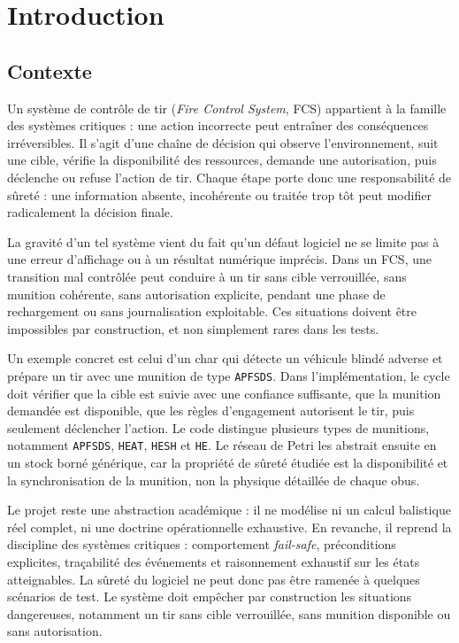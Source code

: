 \documentclass[11pt,a4paper]{report}
\begin{document}
\tableofcontents
\listoffigures
\listoftables
\clearpage
{}

\chapter{Introduction}

\section{Contexte}
Un système de contrôle de tir (\emph{Fire Control System}, FCS) appartient à la famille des systèmes critiques : une action incorrecte peut entraîner des conséquences irréversibles. Il s'agit d'une chaîne de décision qui observe l'environnement, suit une cible, vérifie la disponibilité des ressources, demande une autorisation, puis déclenche ou refuse l'action de tir. Chaque étape porte donc une responsabilité de sûreté : une information absente, incohérente ou traitée trop tôt peut modifier radicalement la décision finale.

La gravité d'un tel système vient du fait qu'un défaut logiciel ne se limite pas à une erreur d'affichage ou à un résultat numérique imprécis. Dans un FCS, une transition mal contrôlée peut conduire à un tir sans cible verrouillée, sans munition cohérente, sans autorisation explicite, pendant une phase de rechargement ou sans journalisation exploitable. Ces situations doivent être impossibles par construction, et non simplement rares dans les tests.

Un exemple concret est celui d'un char qui détecte un véhicule blindé adverse et prépare un tir avec une munition de type \texttt{APFSDS}. Dans l'implémentation, le cycle doit vérifier que la cible est suivie avec une confiance suffisante, que la munition demandée est disponible, que les règles d'engagement autorisent le tir, puis seulement déclencher l'action. Le code distingue plusieurs types de munitions, notamment \texttt{APFSDS}, \texttt{HEAT}, \texttt{HESH} et \texttt{HE}. Le réseau de Petri les abstrait ensuite en un stock borné générique, car la propriété de sûreté étudiée est la disponibilité et la synchronisation de la munition, non la physique détaillée de chaque obus.

Le projet reste une abstraction académique : il ne modélise ni un calcul balistique réel complet, ni une doctrine opérationnelle exhaustive. En revanche, il reprend la discipline des systèmes critiques : comportement \emph{fail-safe}, préconditions explicites, traçabilité des événements et raisonnement exhaustif sur les états atteignables. La sûreté du logiciel ne peut donc pas être ramenée à quelques scénarios de test. Le système doit empêcher par construction les situations dangereuses, notamment un tir sans cible verrouillée, sans munition disponible ou sans autorisation.
\end{document}
